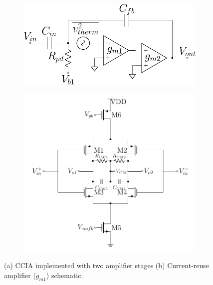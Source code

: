 \begin{figure}[!h]
       \centering
       \begin{subfigure}[c]{0.49\linewidth}
           \centering
           \includegraphics[width=\linewidth]{img/CCIA.pdf}
           \caption[]%
           {{\small }}
           \label{fig:CCIA}
        \end{subfigure}
        \hfill
        \begin{subfigure}[c]{0.49\linewidth}  
            \centering 
            \includegraphics[width=\linewidth]{img/CurrentReuseSharedBias.pdf}
            \caption[]%
            {{\small }}
            \label{fig:CRCISHAREDBIAS}
        \end{subfigure}
        \caption[ Don't write caption here ]
        {\small (a) CCIA implemented with two amplifier stages (b) Current-reuse amplifier ($g_{m1}$) schematic. } 
        \label{fig:CCIA and current reuse}
\end{figure}

